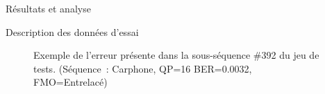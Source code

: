 \begin{chapter}{Résultats et analyse}
\begin{section}{Description des données d'essai}
\begin{figure}[htb]
\caption[Erreur présente dans la sous-séquence \#392 du jeu de tests]{Exemple de
l'erreur présente dans la sous-séquence \#392 du jeu de tests. (Séquence~:
Carphone, QP=16 BER=0.0032, FMO=Entrelacé)}
\label{fig-392}
\end{figure}


\end{section}
\end{chapter}
